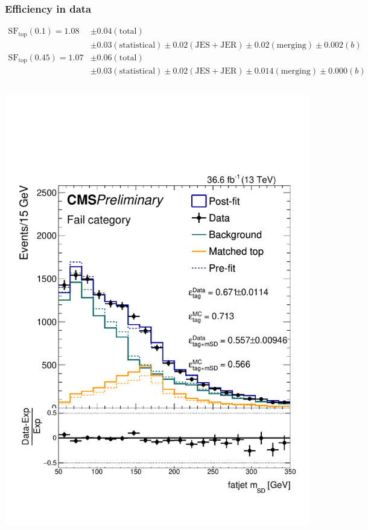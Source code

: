 \documentclass[aspectratio=169,xcolor=dvipsnames,,table,compress]{beamer}
\begin{document}
\begin{frame}
\begin{columns}
\begin{column}{0.25\textwidth}
    \end{column}
  \end{columns}
\end{frame}

\begin{frame} \frametitle{Efficiency in data}
  \vspace{-5mm}
\begin{align*}
    \mathrm{SF}_\mathrm{top}(0.1) = 1.08 & \pm 0.04 (\mathrm{total}) \nonumber \\ 
                                         & \pm 0.03 (\mathrm{statistical}) \pm 0.02 (\mathrm{JES+JER}) \pm 0.02 (\mathrm{merging}) \pm 0.002 (b) \nonumber \\ 
    \mathrm{SF}_\mathrm{top}(0.45) = 1.07 & \pm 0.06 (\mathrm{total}) \nonumber \\ 
                                         & \pm 0.03 (\mathrm{statistical}) \pm 0.02 (\mathrm{JES+JER}) \pm 0.014 (\mathrm{merging}) \pm 0.000 (b) 
\end{align*}
  \begin{columns}
    \begin{column}{0.25\textwidth}
            \includegraphics[width=\textwidth]{../figures/toptagging/sf/loose_fail.pdf}

\end{column}
\end{columns}
\end{frame}
\end{document}
